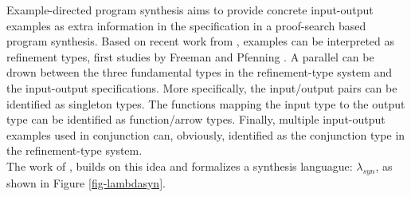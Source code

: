 \documentclass[preprint, 11pt]{sigplanconf}
\begin{document}
Example-directed program synthesis aims to provide concrete input-output examples as extra information in the specification in a proof-search based program synthesis. Based on recent work from \citet{frankle2016example}, examples can be interpreted as refinement types, first studies by Freeman and Pfenning \cite{freeman1991refinement}\cite{pfenning1993refinement}. A parallel can be drown between the three fundamental types in the refinement-type system and the input-output specifications. More specifically, the input/output pairs can be identified as singleton types. The functions mapping the input type to the output type can be identified as function/arrow types. Finally, multiple input-output examples used in conjunction can, obviously, identified as the conjunction type in the refinement-type system.\\

The work of \citet{osera2015type}, builds on this idea and formalizes a synthesis languague: $\lambda_{syn}$, as shown in Figure \ref{fig-lambdasyn}. \\
\end{document}

